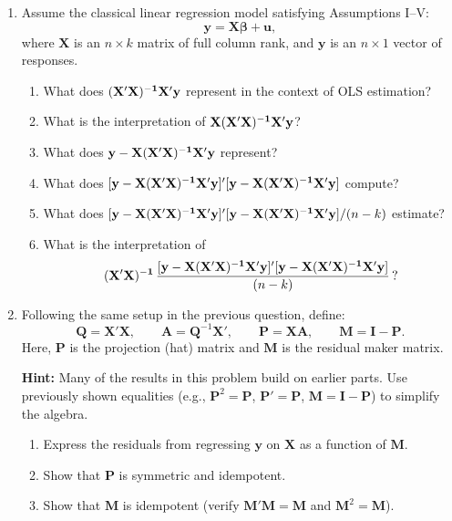 \documentclass[12pt]{article}
\newcommand{\X}{\ensuremath{\mathbf{X}}}
\newcommand{\y}{\ensuremath{\mathbf{y}}}
\newcommand{\I}{\ensuremath{\mathbf{I}}}
\newcommand{\M}{\ensuremath{\mathbf{M}}}
\renewcommand{\P}{\ensuremath{\mathbf{P}}}
\begin{document}
\begin{enumerate}
\item 
Assume the classical linear regression model satisfying Assumptions I–V:
\[
\mathbf{y} = \mathbf{X}\boldsymbol{\beta} + \mathbf{u},
\]
where $\mathbf{X}$ is an $n \times k$ matrix of full column rank, and $\mathbf{y}$ is an $n \times 1$ vector of responses.  

\begin{enumerate}\itemsep6em
\item What does ${\bf (X'X)^{-1}X'y}$ represent in the context of OLS estimation?  

\item What is the interpretation of ${\bf X(X'X)^{-1}X'y}$?  

\item What does ${\bf y} - {\bf X(X'X)^{-1}X'y}$ represent?  

\item What does $[{\bf y} - {\bf X(X'X)^{-1}X'y}]'[{\bf y} - {\bf X(X'X)^{-1}X'y}]$ compute?  

\item What does $[{\bf y} - {\bf X(X'X)^{-1}X'y}]'[{\bf y} - {\bf X(X'X)^{-1}X'y}]/(n-k)$ estimate?

\item What is the interpretation of
\[
{\bf (X'X)^{-1}}\,\frac{[{\bf y} - {\bf X(X'X)^{-1}X'y}]'[{\bf y} - {\bf X(X'X)^{-1}X'y}]}{(n-k)}\,?
\]
\end{enumerate}
\clearpage

\item Following the same setup in the previous question, define:
\[
\mathbf{Q}=\X'\X,\qquad \mathbf{A}=\mathbf{Q}^{-1}\X',\qquad \P=\X\mathbf{A},\qquad \M=\I-\P.
\]
Here, $\P$ is the projection (hat) matrix and $\M$ is the residual maker matrix.

\medskip\noindent \textbf{Hint:} Many of the results in this problem build on earlier parts. Use previously shown equalities (e.g., $\P^2=\P$, $\P'=\P$, $\M=\I-\P$) to simplify the algebra.

\begin{enumerate}\itemsep7em
\item Express the residuals from regressing $\y$ on $\X$ as a function of $\M$.  

\item Show that $\P$ is symmetric and idempotent. 

\item Show that $\M$ is idempotent (verify $\M'\M=\M$ and $\M^2=\M$).  


\end{enumerate}
\end{enumerate}
\end{document}
